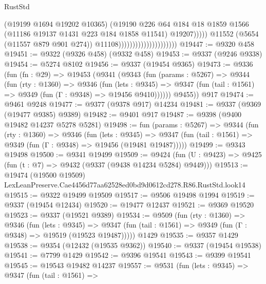 \begin{lexlean}{RustStd}
\begin{coremodule}
                                                      (@19199 @1694 @19202 @10365)
                                                      (@19190
                                                        @226
                                                        @64
                                                        @184
                                                        @18
                                                        @1859
                                                        @1566
                                                        (@11186 @19137 @1431 @223 @184 @1858 @11541)
                                                        @19207)))))
                                              @11552
                                              (@5654 (@11557 @879 @901 @274))
                                              @11108)))))))))))))))))))))
@19447 := @9320 @458
@19451 := @9322 (@9326 @458) (@9332 @458)
@19453 := @9337 (@9246 @9338)
@19454 := @5274 @8102
@19456 := @9337 (@19454 @9365)
@19473 := @9336
    (fun (fn : @29) =>
    @19453
      (@9341
        (@9343
          (fun (params : @5267) =>
          @9344
            (fun (rty : @1360) =>
            @9346
              (fun (lets : @9345) =>
              @9347 (fun (tail : @1561) => @9349 (fun (Γ : @9348) => @19456 @9410))))))
        @9455))
    @917
@19474 := @9461 @9248
@19477 := @9377 (@9378 @917) @14234
@19481 := @9337 (@9369 (@19477 @9385) @9389)
@19482 := @9401 @917
@19487 := @9398 (@9400 @19482 @14237 @5278 @5281)
@19498 := fun (params : @5267) =>
  @9344
    (fun (rty : @1360) =>
    @9346
      (fun (lets : @9345) =>
      @9347 (fun (tail : @1561) => @9349 (fun (Γ : @9348) => @19456 (@19481 @19487)))))
@19499 := @9343 @19498
@19500 := @9341 @19499
@19509 := @9424
    (fun (U : @9423) => @9425 (fun (t : @7) => @9432 (@9337 (@9438 @14234 @5284) @9449)))
@19513 := @19474
    (@19500 @19509)
    LexLeanPreserve.Cae4456d77aa62528ed0bd9d0612cd278.R86.RustStd.look14
@19515 := @9322 @19499 @19509
@19517 := @9506 @19498 @1994
@19519 := @9337 (@19454 @12434)
@19520 := @19477 @12437
@19521 := @9369 @19520
@19523 := @9337 (@19521 @9389)
@19534 := @9509
    (fun (rty : @1360) =>
    @9346
      (fun (lets : @9345) =>
      @9347 (fun (tail : @1561) => @9349 (fun (Γ : @9348) => @19519 (@19523 @19487)))))
    @1429
@19535 := @9357 @1429
@19538 := @9354 (@12432 (@19535 @9362))
@19540 := @9337 (@19454 @19538)
@19541 := @7799 @1429
@19542 := @9396 @19541
@19543 := @9399 @19541
@19545 := @19543 @19482 @14237
@19557 := @9531
    (fun (lets : @9345) =>
    @9347
      (fun (tail : @1561) =>

\end{coremodule}
\end{lexlean}
